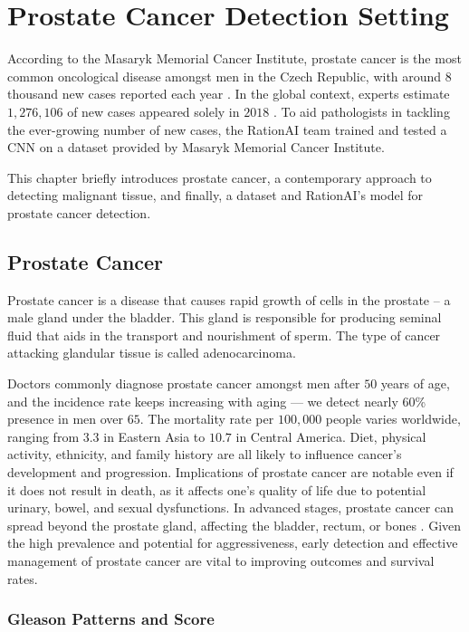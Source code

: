 \chapter{Prostate Cancer Detection Setting}

According to the Masaryk Memorial Cancer Institute, prostate cancer is the most common oncological disease amongst men in the Czech Republic, with around $8$ thousand new cases reported each year \cite{mmci-prostate-cancer}.
In the global context, experts estimate $1,276,106$ of new cases appeared solely in $2018$ \cite{world-prostate-cancer}.
To aid pathologists in tackling the ever-growing number of new cases, the RationAI team trained and tested a CNN on a dataset provided by Masaryk Memorial Cancer Institute.

This chapter briefly introduces prostate cancer, a contemporary approach to detecting malignant tissue, and finally, a dataset and RationAI's model for prostate cancer detection.

\section{Prostate Cancer}

Prostate cancer is a disease that causes rapid growth of cells in the prostate -- a male gland under the bladder.
This gland is responsible for producing seminal fluid that aids in the transport and nourishment of sperm.
The type of cancer attacking glandular tissue is called adenocarcinoma.

Doctors commonly diagnose prostate cancer amongst men after $50$ years of age, and the incidence rate keeps increasing with aging --- we detect nearly $60$\% presence in men over $65$.
The mortality rate per $100,000$ people varies worldwide, ranging from $3.3$ in Eastern Asia to $10.7$ in Central America. Diet, physical activity, ethnicity, and family history are all likely to influence cancer's development and progression.
Implications of prostate cancer are notable even if it does not result in death, as it affects one's quality of life due to potential urinary, bowel, and sexual dysfunctions.
In advanced stages, prostate cancer can spread beyond the prostate gland, affecting the bladder, rectum, or bones \cite{world-prostate-cancer}.
Given the high prevalence and potential for aggressiveness, early detection and effective management of prostate cancer are vital to improving outcomes and survival rates.

\subsection*{Gleason Patterns and Score}

